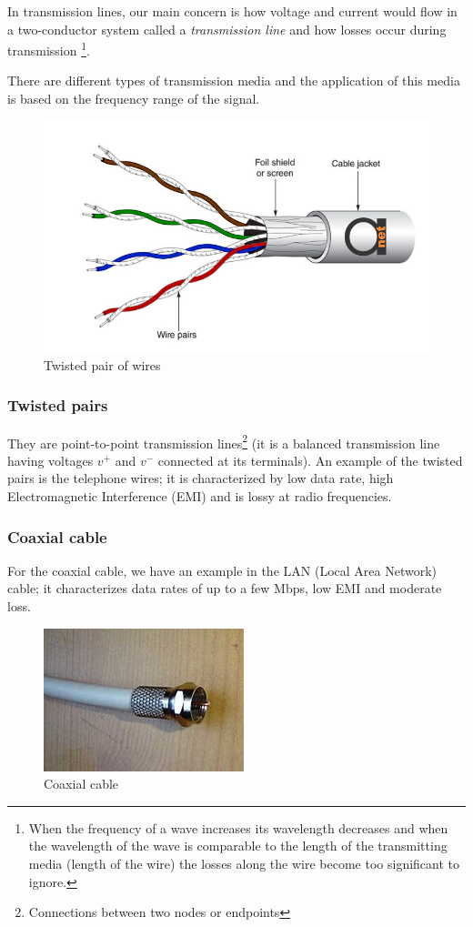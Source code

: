 In transmission lines, our main concern is how voltage and current would flow in a two-conductor system called a \textit{transmission line} and how losses occur during transmission \footnote{
When the frequency of a wave increases its wavelength decreases and when the wavelength of the wave is comparable to the length of the transmitting media (length of the wire) the losses along the wire become too significant to ignore.
}.

There are different types of transmission media and the application of this media is based on the frequency range of the signal.
\begin{figure}[h]
\centering
\includegraphics[width=1\linewidth]{./graphics/twistedpairs}
\caption{Twisted pair of wires}
\end{figure} 

\subsubsection{Twisted pairs}
They are point-to-point transmission lines\footnote{
Connections between two nodes or endpoints
} (it is a balanced transmission line having voltages $v^{+}$ and $v^{-}$ connected at its terminals). An example of the twisted pairs is the telephone wires; it is characterized by low data rate, high Electromagnetic Interference (EMI) and is lossy at radio frequencies.

\subsubsection{Coaxial cable}
For the coaxial cable, we have an example in the LAN (Local Area Network) cable; it characterizes data rates of up to a few Mbps, low EMI and moderate loss.
\begin{figure}[h]
\centering
\includegraphics[scale=0.5]{./graphics/coaxialcable}
\caption{Coaxial cable}
\end{figure}

